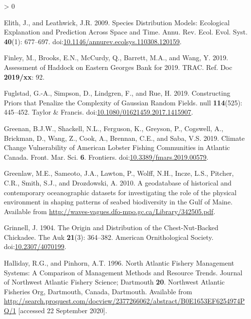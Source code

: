\documentclass[
]{article}
\newlength{\cslhangindent}
\newenvironment{CSLReferences}[2] %
 {%
  \setlength{\parindent}{0pt}
  \ifodd #1 \everypar{\setlength{\hangindent}{\cslhangindent}}\ignorespaces\fi
  \ifnum #2 > 0
  \setlength{\parskip}{#2\baselineskip}
  \fi
 }%
 {}
\begin{document}
\begin{CSLReferences}{1}{0}
\leavevmode\hypertarget{ref-elithSpeciesDistributionModels2009}{}%
Elith, J., and Leathwick, J.R. 2009. Species {Distribution Models}: {Ecological Explanation} and {Prediction Across Space} and {Time}. Annu. Rev. Ecol. Evol. Syst. \textbf{40}(1): 677--697. doi:\href{https://doi.org/10.1146/annurev.ecolsys.110308.120159}{10.1146/annurev.ecolsys.110308.120159}.

\leavevmode\hypertarget{ref-finleyAssessmentHaddockEastern2019}{}%
Finley, M., Brooks, E.N., McCurdy, Q., Barrett, M.A., and Wang, Y. 2019. Assessment of {Haddock} on {Eastern Georges Bank} for 2019. TRAC. Ref. Doc \textbf{2019/xx}: 92.

\leavevmode\hypertarget{ref-fuglstadConstructingPriorsThat2019}{}%
Fuglstad, G.-A., Simpson, D., Lindgren, F., and Rue, H. 2019. Constructing {Priors} that {Penalize} the {Complexity} of {Gaussian Random Fields}. null \textbf{114}(525): 445--452. {Taylor \& Francis}. doi:\href{https://doi.org/10.1080/01621459.2017.1415907}{10.1080/01621459.2017.1415907}.

\leavevmode\hypertarget{ref-greenanClimateChangeVulnerability2019}{}%
Greenan, B.J.W., Shackell, N.L., Ferguson, K., Greyson, P., Cogswell, A., Brickman, D., Wang, Z., Cook, A., Brennan, C.E., and Saba, V.S. 2019. Climate {Change Vulnerability} of {American Lobster Fishing Communities} in {Atlantic Canada}. Front. Mar. Sci. \textbf{6}. {Frontiers}. doi:\href{https://doi.org/10.3389/fmars.2019.00579}{10.3389/fmars.2019.00579}.

\leavevmode\hypertarget{ref-greenlawGeodatabaseHistoricalContemporary2010}{}%
Greenlaw, M.E., Sameoto, J.A., Lawton, P., Wolff, N.H., Incze, L.S., Pitcher, C.R., Smith, S.J., and Drozdowski, A. 2010. A geodatabase of historical and contemporary oceanographic datasets for investigating the role of the physical environment in shaping patterns of seabed biodiversity in the {Gulf} of {Maine}. Available from \url{http://waves-vagues.dfo-mpo.gc.ca/Library/342505.pdf}.

\leavevmode\hypertarget{ref-grinnellOriginDistributionChestNutBacked1904}{}%
Grinnell, J. 1904. The {Origin} and {Distribution} of the {Chest}-{Nut}-{Backed Chickadee}. The Auk \textbf{21}(3): 364--382. {American Ornithological Society}. doi:\href{https://doi.org/10.2307/4070199}{10.2307/4070199}.

\leavevmode\hypertarget{ref-hallidayNorthAtlanticFishery1996}{}%
Halliday, R.G., and Pinhorn, A.T. 1996. North {Atlantic Fishery Management Systems}: {A Comparison} of {Management Methods} and {Resource Trends}. Journal of Northwest Atlantic Fishery Science; Dartmouth \textbf{20}. {Northwest Atlantic Fisheries Org}, {Dartmouth, Canada, Dartmouth}. Available from \url{http://search.proquest.com/docview/2377266062/abstract/B0E1653EF6254974PQ/1} {[}accessed 22 September 2020{]}.


\end{CSLReferences}
\end{document}
